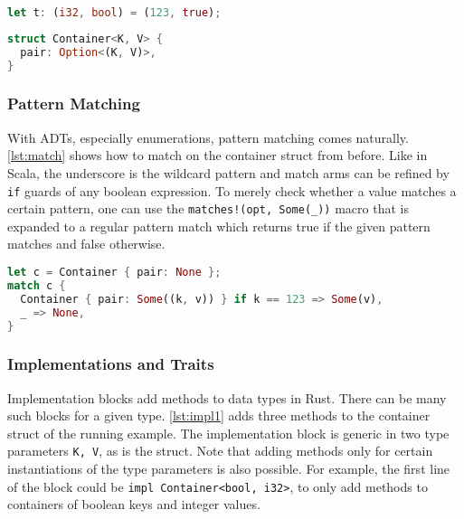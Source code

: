 \noindent\begin{minipage}[t]{.45\textwidth}
\begin{lstlisting}[language=Rust, style=short, caption={A 2-tuple in Rust.}, label=lst:tuples]
let t: (i32, bool) = (123, true);
\end{lstlisting}
\end{minipage}\hfill
\begin{minipage}[t]{.45\textwidth}
\begin{lstlisting}[language=Rust, style=short, label={lst:container}, caption={The struct for the running example.}]
struct Container<K, V> {
  pair: Option<(K, V)>,
}
\end{lstlisting}
\end{minipage}

\subsubsection{Pattern Matching}

With ADTs, especially enumerations, pattern matching comes naturally.
\autoref{lst:match} shows how to match on the container struct from before. Like
in Scala, the underscore is the wildcard pattern and match arms can be  refined
by \lstinline!if! guards of any boolean expression. To merely check whether a
value matches a certain pattern, one can use the
\passthrough{\lstinline"matches!(opt, Some(_))"} macro that is expanded to a
regular pattern match which returns true if the given pattern matches and false
otherwise.

\begin{lstlisting}[language=Rust, caption={Pattern matching on a struct.}, label=lst:match]
let c = Container { pair: None };
match c {
  Container { pair: Some((k, v)) } if k == 123 => Some(v),
  _ => None,
}
\end{lstlisting}

\subsubsection{Implementations and Traits}

Implementation blocks add methods to data types in Rust. There can be many such
blocks for a given type. \autoref{lst:impl1} adds three methods to the container
struct of the running example. The implementation block is generic in two type
parameters \passthrough{\lstinline!K, V!}, as is the struct. Note that adding
methods only for certain instantiations of the  type parameters is also
possible. For example, the first line of the block could be
\passthrough{\lstinline!impl Container<bool, i32>!}, to only add methods to
containers of boolean keys and integer values.

